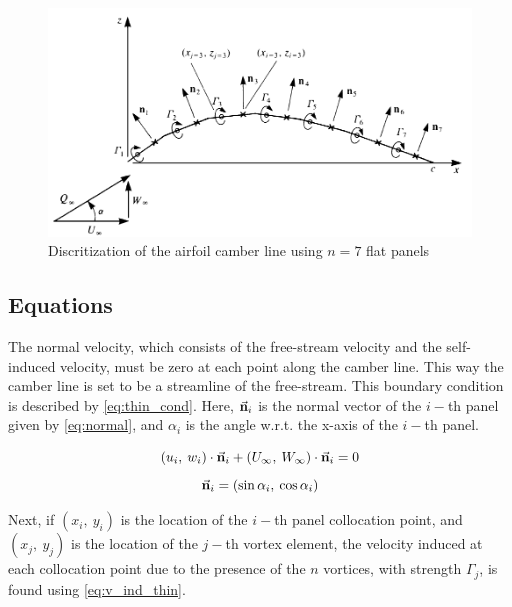 \begin{figure}[H]
\centering
\includegraphics[width=.8\textwidth]{static/disc_camber.png}
\caption{Discritization of the airfoil camber line using $n=7$ flat panels\cite{katz_plotkin}}
\label{fig:discr_thin}
\end{figure}

\subsection{Equations}
The normal velocity, which consists of the free-stream velocity and the
self-induced velocity, must be zero at each point along the camber line. This
way the camber line is set to be a streamline of the free-stream. This
boundary condition is described by \autoref{eq:thin_cond}. Here,
$\vec{\bf{n}}_i$ is the normal vector of the $i-$th panel given by
\autoref{eq:normal}, and $\alpha_i$ is the angle w.r.t. the x-axis of the $i-$th
panel.

\begin{equation}
\label{eq:thin_cond}
    \left( u_i, \: w_i \right) \cdot \vec{\bf{n}}_i + \left( U_\infty,
    \: W_\infty \right) \cdot  \vec{\bf{n}}_i = 0
\end{equation}
\begin{equation}
\label{eq:normal}
    \vec{\bf{n}}_i = \left( \sin \alpha_i, \: \cos \alpha_i \right)
\end{equation}

Next, if $\left( x_i, \: y_i \right)$ is the location of the $i-$th panel
collocation point, and $\left( x_j, \: y_j \right)$ is the location of the
$j-$th vortex element, the velocity induced at each collocation point due to the
presence of the $n$ vortices, with strength $\Gamma_j$, is found using
\autoref{eq:v_ind_thin}.
\medskip

